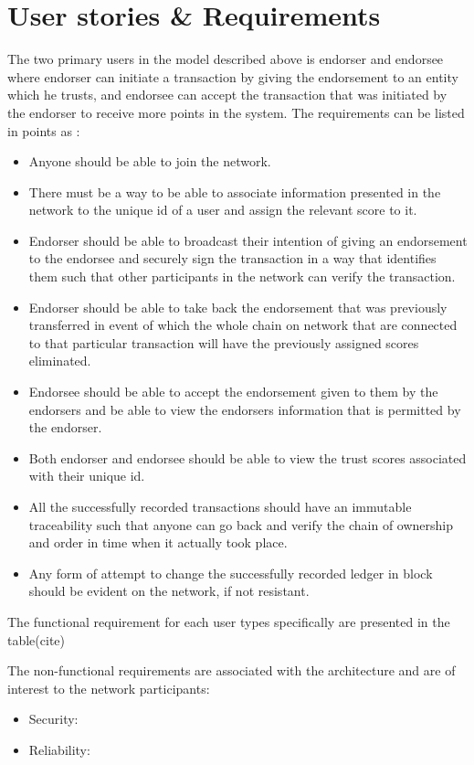 \section{ User stories \& Requirements}
The two primary users in the model described above is endorser and endorsee 
where endorser can initiate a transaction by giving the endorsement to an 
entity which he trusts, and endorsee can accept the transaction that was 
initiated by the endorser to receive more points in the system. 
The requirements can be listed in points as : \\
\begin{itemize}
\item Anyone should be able to join the network.  
\item There must be a way to be able to associate information presented in the 
network to the unique id of a user and assign the relevant score to it.
\item Endorser should be able to broadcast their intention of giving an 
endorsement to the endorsee and securely sign the transaction in a way that 
identifies them such that other participants in the network can verify the 
transaction. 
\item Endorser should be able to take back the endorsement that was previously 
transferred in event of which the whole chain on network that are connected 
to that particular transaction will have the previously assigned scores 
eliminated. 
\item Endorsee should be able to accept the endorsement given to them by the  
endorsers and be able to view the endorsers information that is permitted by 
the endorser. 
\item Both endorser and endorsee should be able to view the trust scores 
associated with their unique id. 
\item All the successfully recorded transactions should have an immutable 
traceability such that anyone can go back and verify the chain of ownership 
and order in time when it actually took place. 
\item Any form of attempt to change the successfully recorded ledger in block 
should be evident on the network, if not resistant. 
\end{itemize}

The functional requirement for each user types specifically are presented 
in the table(cite)


The non-functional requirements are associated with the architecture and are 
of interest to the network participants: \\
\begin{itemize}
\item Security: 
\item Reliability:
\end{itemize}


